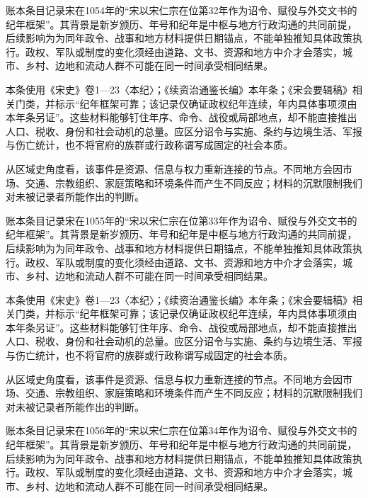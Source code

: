 账本条目记录宋在1054年的“宋以宋仁宗在位第32年作为诏令、赋役与外交文书的纪年框架”。其背景是新岁颁历、年号和纪年是中枢与地方行政沟通的共同前提，后续影响为为同年政令、战事和地方材料提供日期锚点，不能单独推知具体政策执行。政权、军队或制度的变化须经由道路、文书、资源和地方中介才会落实，城市、乡村、边地和流动人群不可能在同一时间承受相同结果。

本条使用《宋史》卷1—23〈本纪〉；《续资治通鉴长编》本年条；《宋会要辑稿》相关门类，并标示“纪年框架可靠；该记录仅确证政权纪年连续，年内具体事项须由本年条另证”。这些材料能够钉住年序、命令、战役或局部地点，却不能直接推出人口、税收、身份和社会动机的总量。应区分诏令与实施、条约与边境生活、军报与伤亡统计，也不将官府的族群或行政称谓写成固定的社会本质。

从区域史角度看，该事件是资源、信息与权力重新连接的节点。不同地方会因市场、交通、宗教组织、家庭策略和环境条件而产生不同反应；材料的沉默限制我们对未被记录者所能作出的判断。

账本条目记录宋在1055年的“宋以宋仁宗在位第33年作为诏令、赋役与外交文书的纪年框架”。其背景是新岁颁历、年号和纪年是中枢与地方行政沟通的共同前提，后续影响为为同年政令、战事和地方材料提供日期锚点，不能单独推知具体政策执行。政权、军队或制度的变化须经由道路、文书、资源和地方中介才会落实，城市、乡村、边地和流动人群不可能在同一时间承受相同结果。

本条使用《宋史》卷1—23〈本纪〉；《续资治通鉴长编》本年条；《宋会要辑稿》相关门类，并标示“纪年框架可靠；该记录仅确证政权纪年连续，年内具体事项须由本年条另证”。这些材料能够钉住年序、命令、战役或局部地点，却不能直接推出人口、税收、身份和社会动机的总量。应区分诏令与实施、条约与边境生活、军报与伤亡统计，也不将官府的族群或行政称谓写成固定的社会本质。

从区域史角度看，该事件是资源、信息与权力重新连接的节点。不同地方会因市场、交通、宗教组织、家庭策略和环境条件而产生不同反应；材料的沉默限制我们对未被记录者所能作出的判断。

账本条目记录宋在1056年的“宋以宋仁宗在位第34年作为诏令、赋役与外交文书的纪年框架”。其背景是新岁颁历、年号和纪年是中枢与地方行政沟通的共同前提，后续影响为为同年政令、战事和地方材料提供日期锚点，不能单独推知具体政策执行。政权、军队或制度的变化须经由道路、文书、资源和地方中介才会落实，城市、乡村、边地和流动人群不可能在同一时间承受相同结果。

